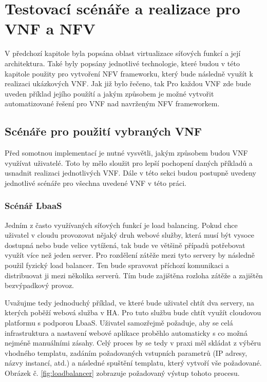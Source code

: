 \chapter{Testovací scénáře a realizace pro VNF a NFV}

V předchozí kapitole byla popsána oblast virtualizace síťových funkcí a její architektura. Také byly popsány jednotlivé technologie, které budou v této kapitole použity pro vytvoření NFV frameworku, který bude následně využít k realizaci ukázkových VNF. Jak již bylo řečeno, tak  Pro každou VNF zde bude uveden příklad jejího použítí a jakým způsobem je možné vytvořit automatizované řešení pro VNF nad navrženým NFV frameworkem.

\section{Scénáře pro použití vybraných VNF}

Před somotnou implementací je nutné vysvětli, jakým způsobem budou VNF využívat uživatelé. Toto by mělo sloužit pro lepší pochopení daných příkladů a usnadnit realizaci jednotlivých VNF. Dále v této sekci budou postupně uvedeny jednotlivé scénáře pro všechna uvedené VNF v této práci. 

\subsection{Scénář LbaaS}

Jedním z často využívaných síťových funkcí je load balancing. Pokud chce uživatel v cloudu provozovat nějaký druh webové služby, která musí být vysoce dostupná nebo bude velice vytížená, tak bude ve většině případů potřebovat využít více než jeden server. Pro rozdělení zátěže mezi tyto servery by následně použil fyzický load balancer. Ten bude spravovat příchozí komunikaci a distribuovat ji mezi několika serverů. Tím bude zajištěna rozloha zátěže a zajištěn bezvýpadkový provoz.

Uvažujme tedy jednoduchý příklad, ve které bude uživatel chtít dva servery, na kterých poběží webová služba v HA. Pro tuto službu bude chtít využít cloudovou platformu s podporou LbaaS. Uživatel samozřejmě požaduje, aby se celá infrastruktura a nastavení webové aplikace proběhlo automaticky s co možná nejméně manuálními zásahy. Celý proces by se tedy v praxi měl skládat z výběru vhodného templatu, zadáním požadovaných vstupních parametrů (IP adresy, názvy instancí, atd.) a následné spuštění templatu, který vytvoří vše požadované. Obrázek č. \ref{fig:loadbalancer} zobrazuje požadovaný výstup tohoto procesu.

